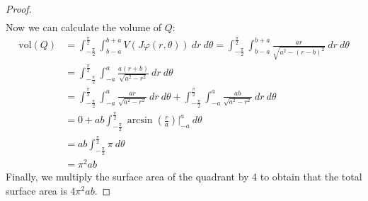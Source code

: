 \documentclass{article}
\newcommand{\vol}{\mathrm{vol}}
\theoremstyle{plain} %
\numberwithin{thm}{section} %
\theoremstyle{definition}
\begin{document}
\begin{proof}
\begin{align*}
        \end{align*}
        Now we can calculate the volume of \(Q\):
        \begin{align*}
            \vol (Q) &= \int _{-\frac{\pi}{2}}^{\frac{\pi}{2}} \int _{b-a}^{b+a} V(J \varphi (r, \theta))\ dr\ d \theta = \int _{-\frac{\pi}{2}}^{\frac{\pi}{2}} \int _{b-a}^{b+a} \frac{ar}{\sqrt{a^2 - (r-b)^2}}\ dr\ d \theta \\
            &= \int _{-\frac{\pi}{2}}^{\frac{\pi}{2}} \int _{-a}^a \frac{a(r + b)}{\sqrt{a^2 - r^2}}\ dr\ d\theta \tag{substitution \(r \mapsto r - b\)} \\
            &= \int _{-\frac{\pi}{2}}^{\frac{\pi}{2}} \int _{-a}^a \frac{ar}{\sqrt{a^2 - r^2}}\ dr\ d \theta + \int _{-\frac{\pi}{2}}^{\frac{\pi}{2}} \int _{-a}^a \frac{ab}{\sqrt{a^2 - r^2}}\ dr\ d \theta \\
            &= 0 + ab\int _{-\frac{\pi}{2}}^{\frac{\pi}{2}} \arcsin \left( \frac{r}{a}\right) \Big| _{-a}^{a}\ d \theta \tag{first integrand is odd} \\
            &= ab \int _{-\frac{\pi}{2}}^{\frac{\pi}{2}} \pi\ d \theta \\
            &= \pi ^2 ab
        \end{align*}
        Finally, we multiply the surface area of the quadrant by 4 to obtain that the total surface area is \(4\pi ^2 ab\).
        \end{proof}
        \newpage
\end{document}
